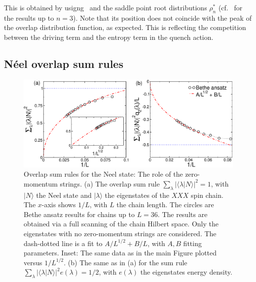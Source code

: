 \documentclass[11pt]{iopart}
\begin{document}
This is obtained by usigng~ and the saddle point root distributions 
$\rho_n^*$ (cf.~ for the results up to $n=3$). Note that its position 
does not coincide with the peak of the overlap distribution function, as expected. 
This is reflecting the competition between the driving term and the entropy 
term in the quench action. 


\subsection{N\'eel overlap sum rules}
\label{sec:5.2}


\begin{figure}[t]
\begin{center}
\includegraphics[width=.9\textwidth]{./draft_figs/Neel}
\end{center}
\caption{ Overlap sum rules for the Neel state: The role of the zero-momentum 
 strings. (a) The overlap sum rule $\sum_{\lambda}|\langle\lambda|N\rangle|^2=1$, 
 with $|N\rangle$ the Neel state and $|\lambda\rangle$ the eigenstates  of 
 the $XXX$ spin chain. The $x$-axis shows $1/L$, with $L$ the chain length. 
 The circles are Bethe ansatz results for chains up to $L=36$. The results 
 are obtained via a full scanning of the chain Hilbert space. Only the 
 eigenstates with no zero-momentum strings are considered. The dash-dotted 
 line is a fit to $A/L^{1/2}+B/L$, with $A,B$ fitting parameters. Inset: 
 The same data as in the main Figure plotted versus $1/L^{1/2}$. (b) 
 The same as in (a) for the sum rule $\sum_{\lambda}|\langle
 \lambda|N\rangle|^2e(\lambda)=1/2$, with $e(\lambda)$  the 
 eigenstates energy density. 
}
\label{fig1:neel-sr}
\end{figure}
\end{document}
